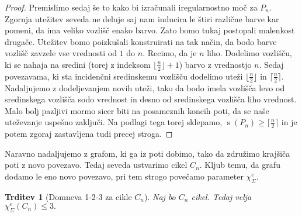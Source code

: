\documentclass[12pt,a4paper,twoside]{article}
\theoremstyle{definition} %
\theoremstyle{plain} %
\newtheorem{trditev}[definicija]{Trditev}
\newcommand{\ec}{\chi_{\Sigma}^e}
\numberwithin{equation}{section}  %
\DeclareMathOperator{\s}{s}
\begin{document}
\begin{proof}
Premislimo sedaj še to kako bi izračunali iregularnostno moč za $P_n$. Zgornja utežitev seveda ne deluje saj nam inducira le štiri različne barve kar pomeni, da ima veliko vozlišč enako barvo. Zato bomo tukaj postopali malenkost drugače. Utežitev bomo poizkušali konstruirati na tak način, da bodo barve vozlišč zavzele vse vrednosti od $1$ do $n$. Recimo, da je $n$ liho. Dodelimo vozlišču, ki se nahaja na sredini (torej z indeksom $\lfloor \frac{n}{2} \rfloor + 1$) barvo z vrednostjo $n$. Sedaj povezavama, ki sta incidenčni sredinskemu vozlišču dodelimo uteži $\lfloor \frac{n}{2} \rfloor$ in $\lceil \frac{n}{2} \rceil$. Nadaljujemo z dodeljevanjem novih uteži, tako da bodo imela vozlišča levo od sredinskega vozlišča sodo vrednost in desno od sredinskega vozlišča liho vrednost. Malo bolj pazljivi mormo sicer biti na posameznih koncih poti, da se naše uteževanje uspešno zaključi. Na podlagi tega torej sklepamo, $\s(P_n) \ge \lceil \frac{n}{2} \rceil$ in je potem zgoraj zastavljena tudi precej stroga.
\end{proof}
Naravno nadaljujemo z grafom, ki ga iz poti dobimo, tako da združimo krajšiča poti z novo povezavo. Tedaj seveda ustvarimo cikel $C_n$. Kljub temu, da grafu dodamo le eno novo povezavo, pri tem strogo povečamo parameter $\ec.$
\begin{trditev}[Domneva 1-2-3 za cikle $C_n$]
\label{res_cycle}
Naj bo $C_n$ cikel. Tedaj velja $\ec(C_n) \le 3.$
\end{trditev}
\end{document}
